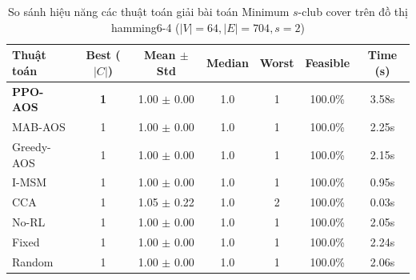 \begin{table}[htbp]
\centering
\caption{So sánh hiệu năng các thuật toán giải bài toán Minimum $s$-club cover trên đồ thị hamming6-4 ($|V|=64, |E|=704, s=2$)}
\label{tab:results_hamming6_4}
\begin{tabular}{lcccccc}
\hline
\textbf{Thuật toán} & \textbf{Best ($|C|$)} & \textbf{Mean $\pm$ Std} & \textbf{Median} & \textbf{Worst} & \textbf{Feasible} & \textbf{Time (s)} \\
\hline
\textbf{PPO-AOS} & \textbf{1} & 1.00 $\pm$ 0.00 & 1.0 & 1 & 100.0\% & 3.58s \\
MAB-AOS & 1 & 1.00 $\pm$ 0.00 & 1.0 & 1 & 100.0\% & 2.25s \\
Greedy-AOS & 1 & 1.00 $\pm$ 0.00 & 1.0 & 1 & 100.0\% & 2.15s \\
I-MSM & 1 & 1.00 $\pm$ 0.00 & 1.0 & 1 & 100.0\% & 0.95s \\
CCA & 1 & 1.05 $\pm$ 0.22 & 1.0 & 2 & 100.0\% & 0.03s \\
No-RL & 1 & 1.00 $\pm$ 0.00 & 1.0 & 1 & 100.0\% & 2.05s \\
Fixed & 1 & 1.00 $\pm$ 0.00 & 1.0 & 1 & 100.0\% & 2.24s \\
Random & 1 & 1.00 $\pm$ 0.00 & 1.0 & 1 & 100.0\% & 2.06s \\
\hline
\end{tabular}
\end{table}
